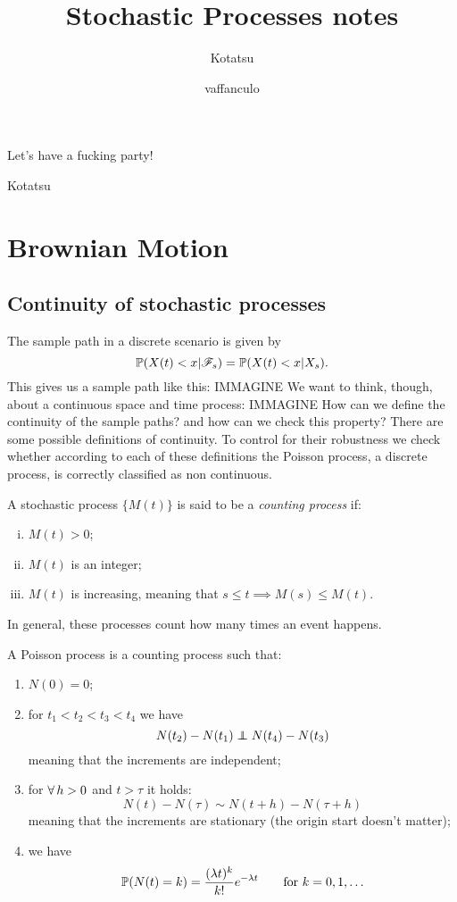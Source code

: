 \documentclass{report}
\begin{document}
	\title{Stochastic Processes notes}
	\author{Kotatsu}
	\date{\small vaffanculo}
	\maketitle
	\begin{preface}
Let's have a fucking party!
		
		\vskip1.2cm
		
		\hfill Kotatsu
	\end{preface}
	\clearpage
	\tableofcontents
\chapter{Brownian Motion}	
	\section{Continuity of stochastic processes}
	The sample path in a discrete scenario is given by
	\begin{equation*}
		\mathbb{P}(X(t)<x|\mathscr{F}_{s})=\mathbb{P}(X(t)<x|X_{s}).
	\end{equation*}
	This gives us a sample path like this:
	IMMAGINE
	We want to think, though, about a continuous space and time process: IMMAGINE
	How can we define the continuity of the sample paths? and how can we check this property? There are some possible definitions of continuity. To control for their robustness we check whether according to each of these definitions the Poisson process, a discrete process, is correctly classified as non continuous.
	\begin{definition}
		A stochastic process $\{M(t)\}$ is said to be a \emph{counting process} if:
		\begin{enumerate}[i.]
			\item $M(t)>0$;
			\item $M(t)$ is an integer;
			\item $M(t)$ is increasing, meaning that $s\leq t\implies M(s)\leq M(t)$.
		\end{enumerate}
	\end{definition}
	In general, these processes count how many times an event happens.
	\begin{definition}
		A Poisson process is a counting process such that:
		\begin{enumerate}
			\item $N(0)=0$;
			\item for $t_1<t_2<t_3<t_4$ we have
			\begin{equation*}
				N(t_2)-N(t_1)\independent N(t_4)-N(t_3)
			\end{equation*}
			meaning that the increments are independent;
			\item for $\forall\, h>0$ and $t>\tau$ it holds:
			\begin{equation*}
				N(t)-N(\tau)\sim N(t+h)-N(\tau+h)
			\end{equation*}
			meaning that the increments are stationary (the origin start doesn't matter);
			\item we have $$\mathbb{P}(N(t)=k)=\frac{(\lambda t)^{k}}{k!}e^{-\lambda t}\qquad\text{for } k=0,1,\ldots$$
		\end{enumerate}
	\end{definition}
\end{document}
